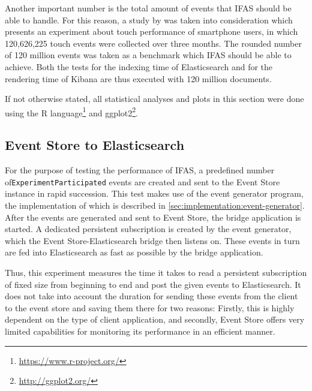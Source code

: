 Another important number is the total amount of events that \ac{IFAS} should be able to handle.
For this reason, a study by \citet{Henze2011} was taken into consideration which presents an experiment about touch performance of smartphone users, in which 120,626,225 touch events were collected over three months.
The rounded number of 120 million events was taken as a benchmark which \ac{IFAS} should be able to achieve.
Both the tests for the indexing time of Elasticsearch and for the rendering time of Kibana are thus executed with 120 million documents.

If not otherwise stated, all statistical analyses and plots in this section were done using the R language\footnote{\url{https://www.r-project.org/}} and ggplot2\footnote{\url{http://ggplot2.org/}}.

\subsection{Event Store to Elasticsearch}
\label{subsec:evaluation:performance:evt-es-bridge}

For the purpose of testing the performance of \ac{IFAS}, a predefined number of\linebreak \texttt{ExperimentParticipated} events are created and sent to the Event Store instance in rapid succession.
This test makes use of the event generator program, the implementation of which is described in \cref{sec:implementation:event-generator}.
After the events are generated and sent to Event Store, the bridge application is started.
A dedicated persistent subscription is created by the event generator, which the Event Store-Elasticsearch bridge then listens on.
These events in turn are fed into Elasticsearch as fast as possible by the bridge application.

Thus, this experiment measures the time it takes to read a persistent subscription of fixed size from beginning to end and post the given events to Elasticsearch.
It does not take into account the duration for sending these events from the client to the event store and saving them there for two reasons:
Firstly, this is highly dependent on the type of client application, and secondly, Event Store offers very limited capabilities for monitoring its performance in an efficient manner.

